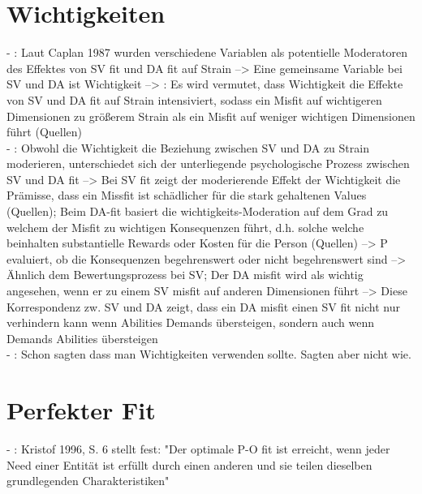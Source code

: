 \section{Wichtigkeiten}
\label{ch:personEnvironmentFit:wichtigkeiten}
- \cite[S. 9]{edwards:1996}: Laut Caplan 1987 wurden verschiedene Variablen als potentielle Moderatoren des Effektes von SV fit und DA fit auf Strain --> Eine gemeinsame Variable bei SV und DA ist Wichtigkeit --> \cite[S. 10]{edwards:1996}: Es wird vermutet, dass Wichtigkeit die Effekte von SV und DA fit auf Strain intensiviert, sodass ein Misfit auf wichtigeren Dimensionen zu größerem Strain als ein Misfit auf weniger wichtigen Dimensionen führt (Quellen)\\
- \cite[S. 10]{edwards:1996}: Obwohl die Wichtigkeit die Beziehung zwischen SV und DA zu Strain moderieren, unterschiedet sich der unterliegende psychologische Prozess zwischen SV und DA fit --> Bei SV fit zeigt der moderierende Effekt der Wichtigkeit die Prämisse, dass ein Missfit ist schädlicher für die stark gehaltenen Values (Quellen); Beim DA-fit basiert die wichtigkeits-Moderation auf dem Grad zu welchem der Misfit zu wichtigen Konsequenzen führt, d.h. solche welche beinhalten substantielle Rewards oder Kosten für die Person (Quellen) --> P evaluiert, ob die Konsequenzen begehrenswert oder nicht begehrenswert sind --> Ähnlich dem Bewertungsprozess bei SV; Der DA misfit wird als wichtig angesehen, wenn er zu einem SV misfit auf anderen Dimensionen führt --> Diese Korrespondenz zw. SV und DA zeigt, dass ein DA misfit einen SV fit nicht nur verhindern kann wenn Abilities Demands übersteigen, sondern auch wenn Demands Abilities übersteigen \\
- \cite[S. 20f.]{edwards:2008}: Schon \textcite{copingAndAdaption:1974} sagten dass man Wichtigkeiten verwenden sollte. Sagten aber nicht wie.


\section{Perfekter Fit}
\label{ch:personEnvironmentFit:perfekterFit}
- \cite[S. 4]{edwards:2004}: Kristof 1996, S. 6 stellt fest: "Der optimale P-O fit ist erreicht, wenn jeder Need einer Entität ist erfüllt durch einen anderen und sie teilen dieselben grundlegenden Charakteristiken" \\




